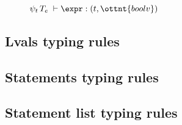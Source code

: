 \begin{figure}[ht!]
    \begin{ottdefnblock}[#1]{$ \psi_t  \,  T_e  \; \vdash  \expr  : (  t  ,  \ottnt{boolv}  ) $}{} \end{ottdefnblock}
    \ottusedrule{\ottdruleeXXtypXXv{}}
    \ottusedrule{\ottdruleeXXtypXXvar{}}
    \ottusedrule{\ottdruleeXXtypXXstar{}}
    \ottusedrule{\ottdruleeXXtypXXstruct{}}
    \ottusedrule{\ottdruleeXXtypXXheader{}}
    \ottusedrule{\ottdruleeXXtypXXnotXXneg{}}
    \ottusedrule{\ottdruleeXXtypXXisXXneg{}}
    \ottusedrule{\ottdruleeXXtypXXacc{}}
    \ottusedrule{\ottdruleeXXtypXXconcat{}}
\end{figure}

\begin{figure}[ht!]
    \ottusedrule{\ottdruleeXXtypXXslice{}}
    \ottusedrule{\ottdruleeXXtypXXselect{}}
    \ottusedrule{\ottdruleeXXtypXXcall{}}
    \ottusedrule{\ottdruleeXXtypXXbinopXXbv{}}
    \ottusedrule{\ottdruleeXXtypXXbinopXXbool{}}
    \ottusedrule{\ottdruleeXXtypXXbinopXXerr{}}
    \ottusedrule{\ottdruleeXXtypXXbinopXXbvXXbool{}}
\end{figure}

\newpage
\subsection{Lvals typing rules}

\begin{figure}[ht!]
    \ottusedrule{\ottdrulelvalXXtypXXvar{}}
    \ottusedrule{\ottdrulelvalXXtypXXacc{}}
    \ottusedrule{\ottdrulelvalXXtypXXslice{}}
\end{figure}

\newpage
\subsection{Statements typing rules}

\begin{figure}[ht!]
    \ottusedrule{\ottdrulestmtXXtypXXempty{}}
    \ottusedrule{\ottdrulestmtXXtypXXassign{}}
    \ottusedrule{\ottdrulestmtXXtypXXassignXXnull{}}
    \ottusedrule{\ottdrulestmtXXtypXXif{}}
    \ottusedrule{\ottdrulestmtXXtypXXdecl{}}
    \ottusedrule{\ottdrulestmtXXtypXXseq{}}
    \ottusedrule{\ottdrulestmtXXtypXXverify{}}
    \ottusedrule{\ottdrulestmtXXtypXXtransition{}}
    \ottusedrule{\ottdrulestmtXXtypXXreturn{}}
    \ottusedrule{\ottdrulestmtXXtypXXapply{}}
    \ottusedrule{\ottdrulestmtXXtypXXext{}}
\end{figure}



\newpage
\subsection{Statement list typing rules}
\ottdefnsstmtlXXtyp



